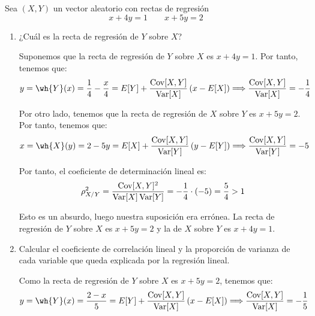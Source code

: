 \begin{ejercicio}
    Sea $(X,Y)$ un vector aleatorio con rectas de regresión
    \begin{equation*}
        x+4y = 1 \qquad x+5y = 2
    \end{equation*}
    \begin{enumerate}
        \item ¿Cuál es la recta de regresión de $Y$ sobre $X$?
        
        Suponemos que la recta de regresión de $Y$ sobre $X$ es $x+4y=1$. Por tanto, tenemos que:
        \begin{equation*}
            y=\wh{Y}(x) = \dfrac{1}{4}-\dfrac{x}{4} = E[Y] + \dfrac{\Cov[X,Y]}{\Var[X]}\left(x-E[X]\right)
            \Longrightarrow
            \dfrac{\Cov[X,Y]}{\Var[X]} = -\dfrac{1}{4}
        \end{equation*}

        Por otro lado, tenemos que la recta de regresión de $X$ sobre $Y$ es $x+5y=2$. Por tanto, tenemos que:
        \begin{equation*}
            x=\wh{X}(y) = 2-5y = E[X] + \dfrac{\Cov[X,Y]}{\Var[Y]}\left(y-E[Y]\right)
            \Longrightarrow
            \dfrac{\Cov[X,Y]}{\Var[Y]} = -5
        \end{equation*}

        Por tanto, el coeficiente de determinación lineal es:
        \begin{equation*}
            \rho_{X/Y}^2 = \dfrac{\operatorname{Cov}[X,Y]^2}{\operatorname{Var}[X]\operatorname{Var}[Y]} = -\dfrac{1}{4}\cdot (-5) = \dfrac{5}{4}>1
        \end{equation*}

        Esto es un absurdo, luego nuestra suposición era errónea. La recta de regresión de $Y$ sobre $X$ es $x+5y=2$ y la de $X$ sobre $Y$ es $x+4y=1$.
        
        
        \item Calcular el coeficiente de correlación lineal y la proporción de varianza de cada variable que queda explicada por la regresión lineal.
        
        Como la recta de regresión de $Y$ sobre $X$ es $x+5y=2$, tenemos que:
        \begin{equation*}
            y=\wh{Y}(x) = \dfrac{2-x}{5} = E[Y] + \dfrac{\Cov[X,Y]}{\Var[X]}\left(x-E[X]\right)
            \Longrightarrow
            \dfrac{\Cov[X,Y]}{\Var[X]} = -\dfrac{1}{5}
        \end{equation*}


\end{enumerate}
\end{ejercicio}
